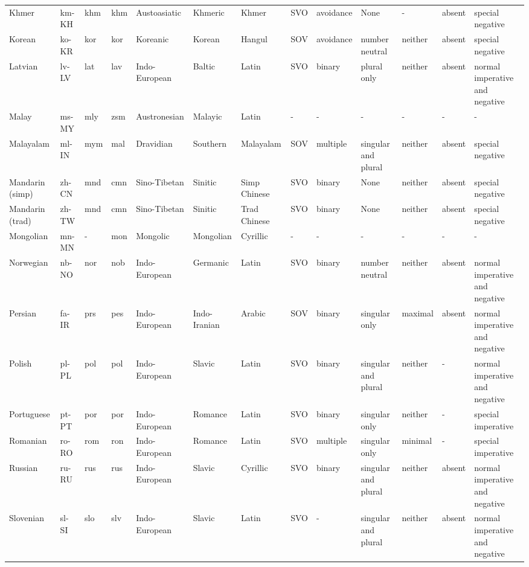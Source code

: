 \documentclass[11pt]{article}
\begin{document}
\begin{table*}[]
{\begin{tabular}{lllllllllllll}
Khmer & km-KH & khm & khm & Austoasiatic & Khmeric & Khmer & SVO & avoidance & None & - & absent & special negative \\
Korean & ko-KR & kor & kor & Koreanic & Korean & Hangul & SOV & avoidance & number neutral & neither & absent & special negative \\
Latvian & lv-LV & lat & lav & Indo-European & Baltic & Latin & SVO & binary & plural only & neither & absent & normal imperative and negative \\
Malay & ms-MY & mly & zsm & Austronesian & Malayic & Latin & - & - & - & - & - & - \\
Malayalam & ml-IN & mym & mal & Dravidian & Southern & Malayalam & SOV & multiple & singular and plural & neither & absent & special negative \\
Mandarin (simp) & zh-CN & mnd & cmn & Sino-Tibetan & Sinitic & Simp Chinese & SVO & binary & None & neither & absent & special negative \\
Mandarin (trad) & zh-TW & mnd & cmn & Sino-Tibetan & Sinitic & Trad Chinese & SVO & binary & None & neither & absent & special negative \\
Mongolian & mn-MN & - & mon & Mongolic & Mongolian & Cyrillic & - & - & - & - & - & - \\
Norwegian & nb-NO & nor & nob & Indo-European & Germanic & Latin & SVO & binary & number neutral & neither & absent & normal imperative and negative \\
Persian & fa-IR & prs & pes & Indo-European & Indo-Iranian & Arabic & SOV & binary & singular only & maximal & absent & normal imperative and negative \\
Polish & pl-PL & pol & pol & Indo-European & Slavic & Latin & SVO & binary & singular and plural & neither & - & normal imperative and negative \\
Portuguese & pt-PT & por & por & Indo-European & Romance & Latin & SVO & binary & singular only & neither & - & special imperative \\
Romanian & ro-RO & rom & ron & Indo-European & Romance & Latin & SVO & multiple & singular only & minimal & - & special imperative \\
Russian & ru-RU & rus & rus & Indo-European & Slavic & Cyrillic & SVO & binary & singular and plural & neither & absent & normal imperative and negative \\
Slovenian & sl-SI & slo & slv & Indo-European & Slavic & Latin & SVO & - & singular and plural & neither & absent & normal imperative and negative \\

\end{tabular}}
\end{table*}
\end{document}
